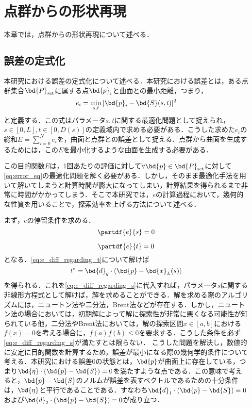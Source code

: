 \section{点群からの形状再現}
本章では，点群からの形状再現について述べる．
	\subsection{誤差の定式化}
		本研究における誤差の定式化について述べる．本研究における誤差とは，ある点群集合$ \bd{P}_{\mathrm{set}} $に属する点$ \bd{p}_i $と曲面との最小距離，つまり，
		\begin{equation}\label{eq:error_eq}
			e_i = \min_{s,t} |\bd{p}_i - \bd{S}(s,t)|^2
		\end{equation}
		と定義する．この式はパラメータ$ s,t $に関する最適化問題として捉えられ，$ s\in [0,L],t \in[0,D(s)] $の定義域内で求める必要がある．こうした求めた$ e_i $の総和$ E =\sum_{i=0}^{N} e_i$を，曲面と点群との誤差として捉える．点群から曲面を生成するためには，この$ E $を最小化するような曲面を生成する必要がある．
		
		この目的関数$ E $は，1回あたりの評価に対して$ \forall \bd{p} \in \bd{P}_{\mathrm{set}}$に対して\ref{eq:error_eq}の最適化問題を解く必要がある．しかし，そのまま最適化手法を用いて解いてしまうと計算時間が膨大になってしまい，計算結果を得られるまで非常に時間がかかってしまう．そこで本研究では，$ e $の計算過程において，幾何的な性質を用いることで，探索効率を上げる方法について述べる．
		
		まず，$ e $の停留条件を求める．
		\begin{equation}\label{eq:e_diff_regarding_s}
			\partdf{e}{s} = 0
		\end{equation}
		
		\begin{equation}\label{eq:e_diff_regarding_t}
			\partdf{e}{t} = 0
		\end{equation}
		となる．\ref{eq:e_diff_regarding_t}について解けば
		\begin{equation}\label{eq:t_eq}
			t^* = \bd{d}_g \cdot (\bd{p} - \bd{x}_L(s))
		\end{equation}
		を得られる．これを\ref{eq:e_diff_regarding_s}に代入すれば，パラメータ$s $に関する非線形方程式として解けば，解を求めることができる．解を求める際のアルゴリズムには，ニュートン法や二分法，Brent法などが存在する．しかし，ニュートン法の場合においては，初期解によって解に探索性が非常に悪くなる可能性が知られている他，二分法やBrent法においては，解の探索区間$x \in [a,b] $における$ f(x) = 0$を考える場合に，$ f(a)f(b)\leq 0 $を要求する．こうした条件を必ず\ref{eq:e_diff_regarding_s}が満たすとは限らない．
		こうした問題を解決し，数値的に安定に目的関数を計算するため，誤差が最小になる際の幾何学的条件について考える．本研究における誤差$ 0 $の状態とは，$ \bd{p} $が曲面上に存在している，つまり$ \bd{\eta}\cdot(\bd{p} - \bd{S})=0 $を満たすような点である．この意味で考えると，$ \bd{p} - \bd{S} $のノルムが誤差を表すベクトルであるための十分条件は，$ \bd{\eta} $と平行であることである．すなわち$ \bd{d}_1 \cdot (\bd{p} - \bd{S}) = 0 $および$ \bd{d}_2 \cdot (\bd{p} - \bd{S}) = 0 $が成り立つ．
		
